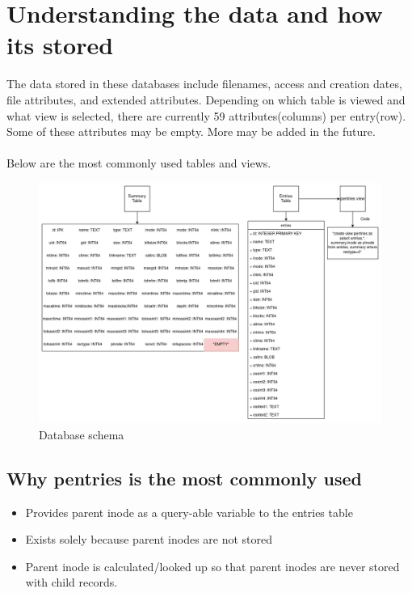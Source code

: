 \section{Understanding the data and how its stored}
The data stored in these databases include filenames, access and creation dates, file attributes, and extended attributes. Depending on which table is viewed and what view is selected, there are currently 59 attributes(columns) per entry(row). Some of these attributes may be empty. More may be added in the future. \\
\\
Below are the most commonly used tables and views. 

\begin{figure} [h]
\centering
\includegraphics[width=1.0\textwidth]{images/Database_Schemas.png}
\caption{\label{fig:Database Schema}Database schema}
\end{figure}

\subsection{Why pentries is the most commonly used}
\begin{itemize}
  \item Provides parent inode as a query-able variable to the entries table
  \item Exists solely because parent inodes are not stored
  \item Parent inode is calculated/looked up so that parent inodes are never stored with child records.
\end{itemize}